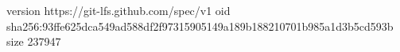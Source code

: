 version https://git-lfs.github.com/spec/v1
oid sha256:93ffe625dca549ad588df2f97315905149a189b188210701b985a1d3b5cd593b
size 237947

